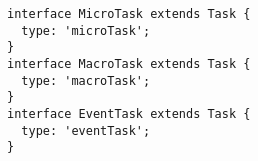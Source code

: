 \begin{verbatim}
interface MicroTask extends Task {
  type: 'microTask';
}
interface MacroTask extends Task {
  type: 'macroTask';
}
interface EventTask extends Task {
  type: 'eventTask';
}
\end{verbatim}
